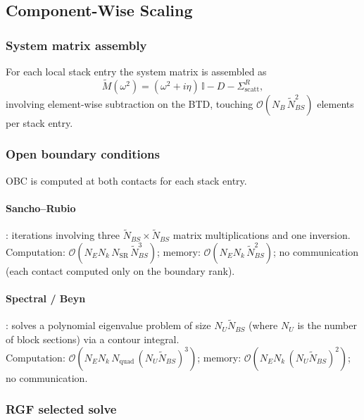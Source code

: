 \subsection{Component-Wise Scaling}
\label{sec:component_scaling}

\subsubsection{System matrix assembly}

For each local stack entry the system matrix is assembled as
\begin{equation}
  \widetilde{M}(\omega^2) = (\omega^2 + i\eta)\,\mathbb{I} - D - \Sigma^R_\mathrm{scatt},
\end{equation}
involving element-wise subtraction on the BTD, touching
$\mathcal{O}(N_B\,\widetilde{N}_{BS}^2)$ elements per stack entry.

\subsubsection{Open boundary conditions}

OBC is computed at both contacts for each stack entry.

\paragraph{Sancho--Rubio}: iterations involving three
$\widetilde{N}_{BS}\times\widetilde{N}_{BS}$ matrix multiplications
and one inversion.  Computation:
$\mathcal{O}(N_E N_k\,N_\mathrm{SR}\,\widetilde{N}_{BS}^3)$; memory:
$\mathcal{O}(N_E N_k\,\widetilde{N}_{BS}^2)$; no communication (each
contact computed only on the boundary rank).

\paragraph{Spectral / Beyn}: solves a polynomial
eigenvalue problem of size $N_U\widetilde{N}_{BS}$ (where $N_U$ is the
number of block sections) via a contour integral. \\ Computation:
$\mathcal{O}(N_E N_k\,N_\mathrm{quad}\,(N_U\widetilde{N}_{BS})^3)$;
memory: $\mathcal{O}(N_E N_k\,(N_U\widetilde{N}_{BS})^2)$; no
communication.

\subsubsection{RGF selected solve}

